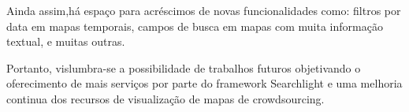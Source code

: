 Ainda assim,há espaço para acréscimos de novas funcionalidades  como: filtros por data em mapas temporais, campos de busca em mapas com muita informação textual, e muitas outras.  

Portanto, vislumbra-se a possibilidade de trabalhos futuros objetivando o oferecimento de mais serviços por parte do framework Searchlight e uma melhoria continua dos recursos de visualização de mapas de crowdsourcing.
